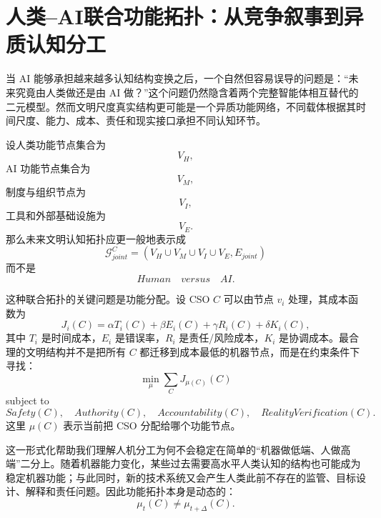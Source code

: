 \section{人类--AI联合功能拓扑：从竞争叙事到异质认知分工}

当 AI 能够承担越来越多认知结构变换之后，一个自然但容易误导的问题是：“未来究竟由人类做还是由 AI 做？”这个问题仍然隐含着两个完整智能体相互替代的二元模型。然而文明尺度真实结构更可能是一个异质功能网络，不同载体根据其时间尺度、能力、成本、责任和现实接口承担不同认知环节。

设人类功能节点集合为
\begin{equation}
V_H,
\end{equation}
AI 功能节点集合为
\begin{equation}
V_M,
\end{equation}
制度与组织节点为
\begin{equation}
V_I,
\end{equation}
工具和外部基础设施为
\begin{equation}
V_E.
\end{equation}
那么未来文明认知拓扑应更一般地表示成
\begin{equation}
\boxed{
\mathcal{G}^{C}_{joint}
=
(
V_H
\cup
V_M
\cup
V_I
\cup
V_E,
E_{joint}
)
}
\end{equation}
而不是
\begin{equation}
Human
\quad versus \quad
AI.
\end{equation}

这种联合拓扑的关键问题是功能分配。设 CSO $C$ 可以由节点 $v_i$ 处理，其成本函数为
\begin{equation}
J_i(C)
=
\alpha T_i(C)
+
\beta E_i(C)
+
\gamma R_i(C)
+
\delta K_i(C),
\end{equation}
其中 $T_i$ 是时间成本，$E_i$ 是错误率，$R_i$ 是责任/风险成本，$K_i$ 是协调成本。最合理的文明结构并不是把所有 $C$ 都迁移到成本最低的机器节点，而是在约束条件下寻找：
\begin{equation}
\min_{\mu}
\sum_C
J_{\mu(C)}(C)
\end{equation}
subject to
\begin{equation}
Safety(C),
\quad
Authority(C),
\quad
Accountability(C),
\quad
RealityVerification(C).
\end{equation}
这里 $\mu(C)$ 表示当前把 CSO 分配给哪个功能节点。

这一形式化帮助我们理解人机分工为何不会稳定在简单的“机器做低端、人做高端”二分上。随着机器能力变化，某些过去需要高水平人类认知的结构也可能成为稳定机器功能；与此同时，新的技术系统又会产生人类此前不存在的监管、目标设计、解释和责任问题。因此功能拓扑本身是动态的：
\begin{equation}
\mu_t(C)
\neq
\mu_{t+\Delta}(C).
\end{equation}

